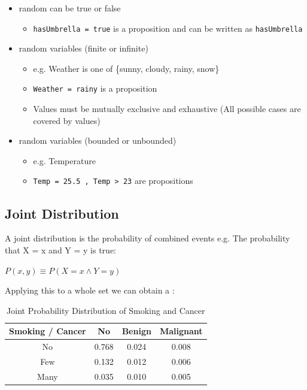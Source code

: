 \documentclass[
../EiKI_Summary.tex,
]
{subfiles}
\begin{document}
\begin{defbox}
    \begin{itemize}
        \item {} random can be true or false
        \begin{itemize}
            \item \texttt{hasUmbrella = true} is a proposition and can be written as \texttt{hasUmbrella}
        \end{itemize}
        \item {} random variables (finite or infinite)
        \begin{itemize}
            \item e.g. Weather is one of \{sunny, cloudy, rainy, snow\}
            \item \texttt{Weather = rainy} is a proposition
            \item Values must be mutually exclusive and exhaustive (All possible cases are covered by values)
        \end{itemize}
        \item {} random variables (bounded or unbounded)
        \begin{itemize}
            \item e.g. Temperature
            \item \texttt{Temp = 25.5 , Temp > 23} are propositions
        \end{itemize}
    \end{itemize}
\end{defbox}

\subsection{Joint Distribution}
A joint distribution is the probability of combined events e.g. The probability that X = x and Y = y is true:

\begin{csmb*}
    $P(x,y) \equiv P(X = x \land Y = y)$
\end{csmb*}

Applying this to a whole set we can obtain a :
\begin{table}[H]
    \centering
    \renewcommand{\arraystretch}{1.3}
    \begin{tabular}{|c|ccc|}
        \hline
        Smoking / \textbf{Cancer} & \textbf{No} & \textbf{Benign} & \textbf{Malignant} \\
        \hline
        No   & 0.768  & 0.024  & 0.008  \\
        Few  & 0.132  & 0.012  & 0.006  \\
        Many & 0.035  & 0.010  & 0.005  \\
        \hline
    \end{tabular}
    \caption{Joint Probability Distribution of Smoking and Cancer}
\end{table}
\end{document}
